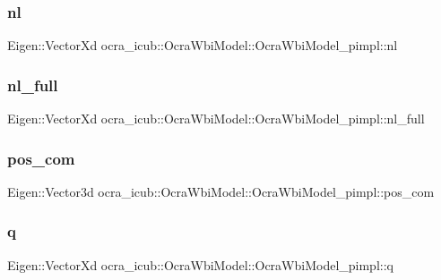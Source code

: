 \subsubsection{\texorpdfstring{nl}{nl}}
{\footnotesize\ttfamily Eigen\+::\+Vector\+Xd ocra\+\_\+icub\+::\+Ocra\+Wbi\+Model\+::\+Ocra\+Wbi\+Model\+\_\+pimpl\+::nl}

\hypertarget{structOcraWbiModel_1_1OcraWbiModel__pimpl_abea2880fe7e4fa2672ce55635ab9ea6c}{}\label{structOcraWbiModel_1_1OcraWbiModel__pimpl_abea2880fe7e4fa2672ce55635ab9ea6c} 
\subsubsection{\texorpdfstring{nl\+\_\+full}{nl\_full}}
{\footnotesize\ttfamily Eigen\+::\+Vector\+Xd ocra\+\_\+icub\+::\+Ocra\+Wbi\+Model\+::\+Ocra\+Wbi\+Model\+\_\+pimpl\+::nl\+\_\+full}

\hypertarget{structOcraWbiModel_1_1OcraWbiModel__pimpl_acc028d57a70c3b36838f28ea518f65c4}{}\label{structOcraWbiModel_1_1OcraWbiModel__pimpl_acc028d57a70c3b36838f28ea518f65c4} 
\subsubsection{\texorpdfstring{pos\+\_\+com}{pos\_com}}
{\footnotesize\ttfamily Eigen\+::\+Vector3d ocra\+\_\+icub\+::\+Ocra\+Wbi\+Model\+::\+Ocra\+Wbi\+Model\+\_\+pimpl\+::pos\+\_\+com}

\hypertarget{structOcraWbiModel_1_1OcraWbiModel__pimpl_a1f83373b2d975e1882ee7812215df997}{}\label{structOcraWbiModel_1_1OcraWbiModel__pimpl_a1f83373b2d975e1882ee7812215df997} 
\subsubsection{\texorpdfstring{q}{q}}
{\footnotesize\ttfamily Eigen\+::\+Vector\+Xd ocra\+\_\+icub\+::\+Ocra\+Wbi\+Model\+::\+Ocra\+Wbi\+Model\+\_\+pimpl\+::q}

